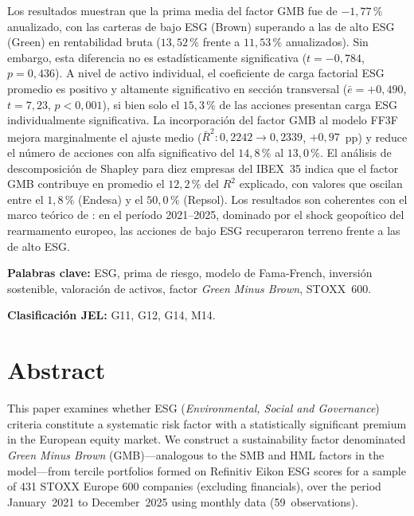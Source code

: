 \documentclass[12pt, a4paper]{article}
\begin{document}
Los resultados muestran que la prima media del factor GMB fue de $-1{,}77\,\%$
anualizado, con las carteras de bajo ESG (Brown) superando a las de alto ESG (Green)
en rentabilidad bruta ($13{,}52\,\%$ frente a $11{,}53\,\%$ anualizados).
Sin embargo, esta diferencia no es estad\'isticamente significativa ($t = -0{,}784$,
$p = 0{,}436$). A nivel de activo individual, el coeficiente de carga factorial ESG
promedio es positivo y altamente significativo en secci\'on transversal
($\bar{e} = +0{,}490$, $t = 7{,}23$, $p < 0{,}001$), si bien solo el $15{,}3\,\%$
de las acciones presentan carga ESG individualmente significativa. La incorporaci\'on
del factor GMB al modelo FF3F mejora marginalmente el ajuste medio
($\bar{R}^2\colon 0{,}2242 \to 0{,}2339$, $+0{,}97$~pp) y reduce el n\'umero de
acciones con alfa significativo del $14{,}8\,\%$ al $13{,}0\,\%$. El an\'alisis de
descomposici\'on de Shapley para diez empresas del IBEX~35 indica que el factor GMB
contribuye en promedio el $12{,}2\,\%$ del $R^2$ explicado, con valores que oscilan
entre el $1{,}8\,\%$ (Endesa) y el $50{,}0\,\%$ (Repsol). Los resultados son
coherentes con el marco te\'orico de \textcites{pastor2021}{pastor2022}: en el
per\'iodo 2021--2025, dominado por el shock geopo\'itico del rearmamento europeo,
las acciones de bajo ESG recuperaron terreno frente a las de alto ESG.

\vspace{1em}
\noindent\textbf{Palabras clave:} ESG, prima de riesgo, modelo de Fama-French,
inversi\'on sostenible, valoraci\'on de activos, factor \textit{Green Minus Brown},
STOXX~600.

\vspace{1em}
\noindent\textbf{Clasificaci\'on JEL:} G11, G12, G14, M14.

\newpage
\thispagestyle{plain}
\section*{Abstract}

\noindent
This paper examines whether ESG (\textit{Environmental, Social and Governance})
criteria constitute a systematic risk factor with a statistically significant premium
in the European equity market. We construct a sustainability factor denominated
\textit{Green Minus Brown} (GMB)---analogous to the SMB and HML factors in the
\textcite{famafrench1993} model---from tercile portfolios formed on Refinitiv Eikon
ESG scores for a sample of 431 STOXX Europe 600 companies (excluding financials),
over the period January~2021 to December~2025 using monthly data (59~observations).
\end{document}

